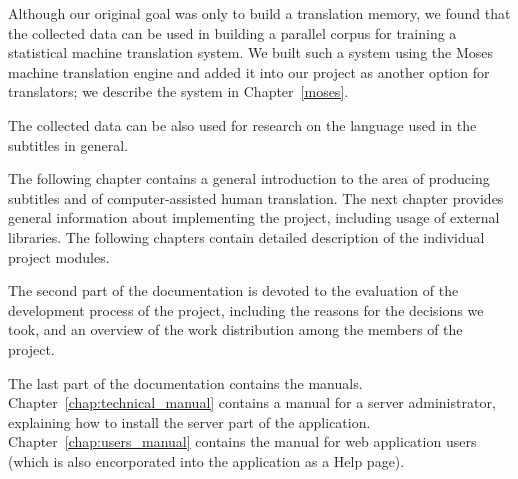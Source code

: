 Although our original goal was only to build a translation memory, we found that the collected data can be used in building a parallel corpus for training a statistical machine translation system. We built such a system using the Moses machine translation engine and added it into our project as another option for translators; we describe the system in Chapter~\ref{moses}.

The collected data can be also used for research on the language used in the subtitles in general.

The following chapter contains a general introduction to the area of producing subtitles and of computer-assisted human translation. The next chapter provides general information about implementing the project, including usage of external libraries. The following chapters contain detailed description of the individual project modules.

The second part of the documentation is devoted to the evaluation of the development process of the project, including the reasons for the decisions we took, and an overview of the work distribution among the members of the project.

The last part of the documentation contains the manuals. Chapter~\ref{chap:technical_manual} contains a manual for a server administrator, explaining how to install the server part of the application. Chapter~\ref{chap:users_manual} contains the manual for web application users (which is also encorporated into the application as a Help page).